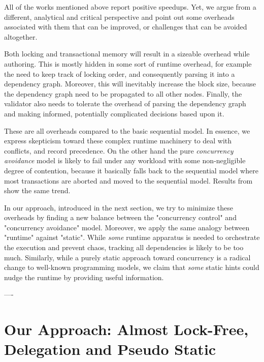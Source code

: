 All of the works mentioned above report positive speedups. Yet, we argue from a different,
analytical and critical perspective and point out some overheads associated with them that can be
improved, or challenges that can be avoided altogether.

Both locking and transactional memory will result in a sizeable overhead while authoring. This is
mostly hidden in some sort of runtime overhead, for example the need to keep track of locking order,
and consequently parsing it into a dependency graph. Moreover, this will inevitably increase the
block size, because the dependency graph need to be propagated to all other nodes. Finally, the
validator also needs to tolerate the overhead of parsing the dependency graph and making informed,
potentially complicated decisions based upon it.

These are all overheads compared to the basic sequential model. In essence, we express skepticism
toward these complex runtime machinery to deal with conflicts, and record precedence. On the other
hand the pure \textit{concurrency avoidance} model is likely to fail under any workload with some
non-negligible degree of contention, because it basically falls back to the sequential model where
most transactions are aborted and moved to the sequential model. Results from
\cite{saraphYOLOEmpiricalStudy2019} show the same trend.

In our approach, introduced in the next section, we try to minimize these overheads by finding a new
balance between the "concurrency control" and "concurrency avoidance" model. Moreover, we apply the
same analogy between "runtime" against "static". While \textit{some} runtime apparatus is needed to
orchestrate the execution and prevent chaos, tracking all dependencies is likely to be too much.
Similarly, while a purely static approach toward concurrency is a radical change to well-known
programming models, we claim that \textit{some} static hints could nudge the runtime by providing
useful information.

----

\section{Our Approach: Almost Lock-Free, Delegation and Pseudo Static}
\label{chap_desgin:sec:design}


